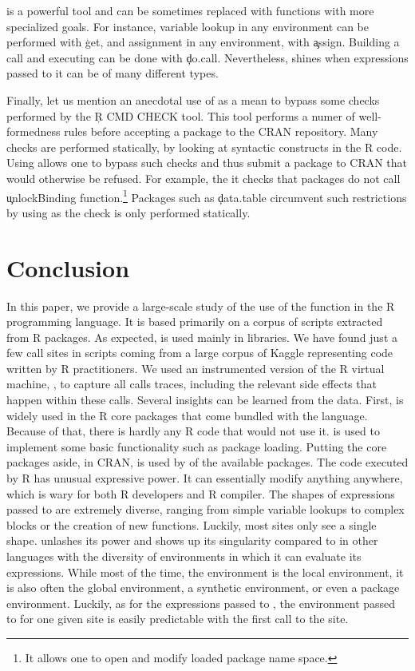\documentclass[review,screen,acmsmall,anonymous=true]{acmart}
\begin{document}
\eval is a powerful tool and can be sometimes replaced with functions with more
specialized goals. For instance, variable lookup in any environment can be
performed with \c{get}, and assignment in any environment, with \c{assign}.
Building a call and executing can be done with \c{do.call}. Nevertheless, \eval
shines when expressions passed to it can be of many different types.

Finally, let us mention an anecdotal use of \eval as a mean to bypass some
checks performed by the \c{R CMD CHECK} tool. This tool performs a numer of
well-formedness rules before accepting a package to the CRAN repository. Many
checks are performed statically, by looking at syntactic constructs in the R
code. Using \eval allows one to bypass such checks and thus submit a package to
CRAN that would otherwise be refused. For example, the it checks that packages
do not call \c{unlockBinding} function.\footnote{It allows one to open and
modify loaded package name space.} Packages such as \c{data.table} circumvent
such restrictions by using \eval as the check is only performed statically.

\section{Conclusion}

In this paper, we provide a large-scale study of the use of the \eval function
in the R programming language. It is based primarily on a corpus of
\CranRunnableScripts scripts extracted from \CranPackages R packages. As
expected, \eval is used mainly in libraries. We have found just a few \eval
call sites in scripts coming from a large corpus of Kaggle representing code
written by R practitioners. We used an instrumented version of the R virtual
machine, \rdyntrace, to capture all \eval calls traces, including the relevant
side effects that happen within these calls. Several insights can be learned
from the data.
%
First, \eval is widely used in the R core packages that come bundled with the
language. Because of that, there is hardly any R code that would not use it.
\eval is used to implement some basic functionality such as package loading.
Putting the core packages aside, in CRAN, \eval is used by \PkgPackagesRatio of
the available \CranPackages packages.
%
The code executed by R \eval has unusual expressive power. It can essentially
modify anything anywhere, which is wary for both R developers and R compiler.
The shapes of expressions passed to \eval are extremely diverse, ranging from
simple variable lookups to complex blocks or the creation of new functions.
Luckily, most sites only see a single shape. \eval unlashes its power and shows
up its singularity compared to \eval in other languages with the diversity of
environments in which it can evaluate its expressions. While most of the time,
the \eval environment is the local environment, it is also often the global
environment, a synthetic environment, or even a package environment. Luckily, as
for the expressions passed to \eval, the environment passed to \eval for one
given site is easily predictable with the first call to the site.
\end{document}
